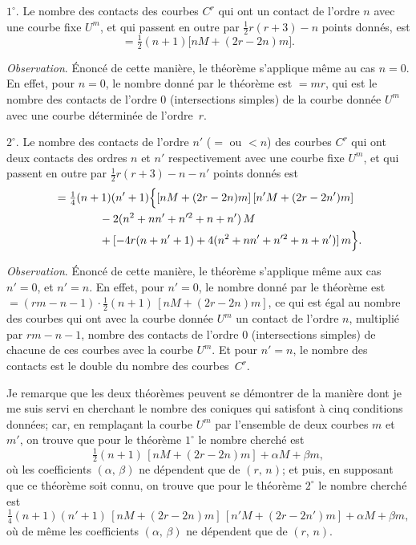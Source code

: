 \documentclass[11pt,a4paper]{article}
\theoremstyle{plain}
\theoremstyle{definition}
\begin{document}
\medskip\noindent
$1^\circ$.  Le nombre des contacts des courbes $C^r$ qui ont un contact de l'ordre $n$ avec
une courbe fixe $U^m$, et qui passent en outre par $\tfrac{1}{2}r(r+3) - n$ points donn\'es, est
\[
= \tfrac{1}{2}(n+1)\bigl[nM + (2r - 2n)m\bigr].
\]

\textit{Observation}.  \'Enonc\'e de cette mani\`ere, le th\'eor\`eme s'applique m\^eme au cas $n = 0$.
En effet, pour $n = 0$, le nombre donn\'e par le th\'eor\`eme est $= mr$, qui est le nombre
des contacts de l'ordre $0$ (intersections simples) de la courbe donn\'ee $U^m$ avec une
courbe d\'etermin\'ee de l'ordre~$r$.

\medskip\noindent
$2^\circ$.  Le nombre des contacts de l'ordre $n'$ ($=$ ou $<n$) des courbes $C^r$ qui ont deux
contacts des ordres $n$ et $n'$ respectivement avec une courbe fixe $U^m$, et qui passent
en outre par $\tfrac{1}{2}r(r+3) - n - n'$ points donn\'es est
\begin{align*}
&= \tfrac{1}{4}(n+1)(n'+1)\Bigl\{[nM + (2r - 2n)m]\,[n'M + (2r - 2n')m] \\
&\qquad\qquad{} - 2(n^2 + nn' + n'^2 + n + n')\,M \\
&\qquad\qquad{} + [-4r(n + n' + 1) + 4(n^2 + nn' + n'^2 + n + n')]\,m\Bigr\}.
\end{align*}

\clearpage

\textit{Observation}.  \'Enonc\'e de cette mani\`ere, le th\'eor\`eme s'applique m\^eme aux cas
$n' = 0$, et $n' = n$.  En effet, pour $n' = 0$, le nombre donn\'e par le th\'eor\`eme est
$= (rm - n - 1) \cdot \tfrac{1}{2}(n+1)\,[nM + (2r-2n)m]$, ce qui est \'egal au nombre des courbes
qui ont avec la courbe donn\'ee $U^m$ un contact de l'ordre $n$, multipli\'e par $rm - n - 1$,
nombre des contacts de l'ordre $0$ (intersections simples) de chacune de ces courbes avec
la courbe $U^m$.  Et pour $n' = n$, le nombre des contacts est le double du nombre des
courbes~$C^r$.

Je remarque que les deux th\'eor\`emes peuvent se d\'emontrer de la mani\`ere dont
je me suis servi en cherchant le nombre des coniques qui satisfont \`a cinq conditions
donn\'ees; car, en rempla\c{c}ant la courbe $U^m$ par l'ensemble de deux courbes $m$ et $m'$,
on trouve que pour le th\'eor\`eme $1^\circ$ le nombre cherch\'e est
\[
\tfrac{1}{2}(n+1)\,[nM + (2r-2n)m] + \alpha M + \beta m,
\]
o\`u les coefficients $(\alpha,\,\beta)$ ne d\'ependent que de $(r,\,n)$; et puis, en supposant que ce
th\'eor\`eme soit connu, on trouve que pour le th\'eor\`eme $2^\circ$ le nombre cherch\'e est
\[
\tfrac{1}{4}(n+1)(n'+1)\,[nM + (2r-2n)m]\,[n'M + (2r-2n')m] + \alpha M + \beta m,
\]
o\`u de m\^eme les coefficients $(\alpha,\,\beta)$ ne d\'ependent que de $(r,\,n)$.
\end{document}
